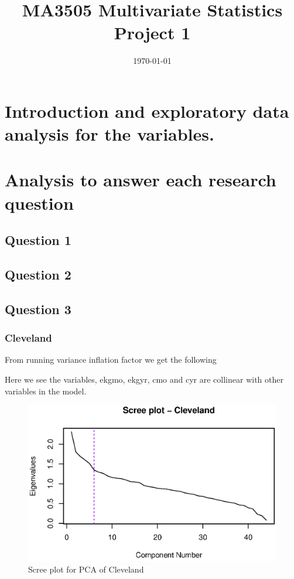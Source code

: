 \documentclass[a4paper]{article}
\title{MA3505 Multivariate Statistics Project 1}
\date{\today}
\begin{document}
\maketitle


\section{Introduction and exploratory data analysis for the variables.}


\section{Analysis to answer each research question}

\subsection{Question 1}


\subsection{Question 2}


\subsection{Question 3}

\subsubsection{Cleveland}

From running variance inflation factor we get the following



Here we see the variables, ekgmo, ekgyr, cmo and cyr are collinear with other variables in the model. 


\begin{figure}[H]
	\begin{center}
		\includegraphics[width=12cm]{question3output/clescreeplot.eps} 
	\end{center}
	\caption{Scree plot for PCA of Cleveland}
	\label{q3-cle-screeplot}
\end{figure}
\end{document}
